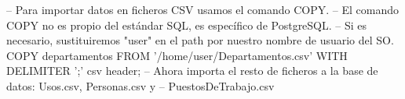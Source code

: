 \lstset{caption=Ejemplo de COPY,label=sql:copy}
\begin{SQL}
-- Para importar datos en ficheros CSV usamos el comando COPY.
-- El comando COPY no es propio del estándar SQL, es específico de PostgreSQL.
-- Si es necesario, sustituiremos "user" en el path por nuestro nombre de usuario del SO.
COPY departamentos FROM '/home/user/Departamentos.csv' WITH DELIMITER ';' csv header;
-- Ahora importa el resto de ficheros a la base de datos: Usos.csv, Personas.csv y
-- PuestosDeTrabajo.csv
\end{SQL}
